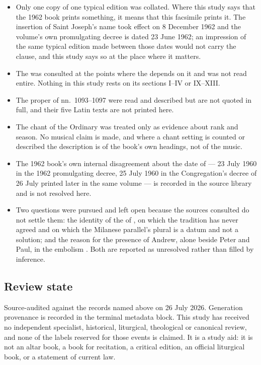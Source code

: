 \begin{itemize}[itemsep=0.2em]
\item Only one copy of one typical edition was collated. Where this study says
that the 1962 book prints something, it means that this facsimile prints it. The
insertion of Saint Joseph's name took effect on 8 December 1962 and the volume's
own promulgating decree is dated 23 June 1962; an impression of the same typical
edition made between those dates would not carry the clause, and this study says
so at the place where it matters.
\item The  was consulted at the points where the
 depends on it and was not read entire. Nothing in this study
rests on its sections I--IV or IX--XIII.
\item The proper  of nn.~1093--1097 were read and
described but are not quoted in full, and their five Latin texts are not
printed here.
\item The chant of the Ordinary was treated only as evidence about rank and
season. No musical claim is made, and where a chant setting is counted or
described the description is of the book's own headings, not of the music.
\item The 1962 book's own internal disagreement about the date of
 --- 23 July 1960 in the 1962 promulgating decree,
25 July 1960 in the Congregation's decree of 26 July printed later in the same
volume --- is recorded in the source library and is not resolved here.
\item Two questions were pursued and left open because the sources consulted do
not settle them: the identity of the  of
, on which the tradition has never agreed and on which the
Milanese parallel's plural is a datum and not a solution; and the reason for
the presence of Andrew, alone beside Peter and Paul, in the embolism
. Both are reported as unresolved rather than filled by
inference.
\end{itemize}

\subsection*{Review state}

Source-audited against the records named above on 26 July 2026. Generation
provenance is recorded in the terminal metadata block. This study has received
no independent specialist, historical, liturgical, theological or canonical
review, and none of the labels reserved for those events is claimed. It is a
study aid: it is not an altar book, a book for recitation, a critical edition,
an official liturgical book, or a statement of current law.
